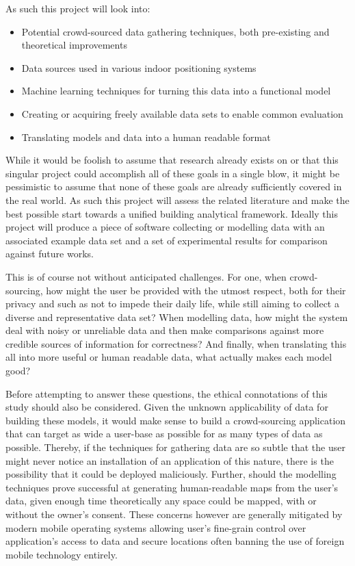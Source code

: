 \documentclass{UoYCSproject}
\begin{document}
        As such this project will look into:
        \begin{itemize}
        	\item Potential crowd-sourced data gathering techniques, both pre-existing and theoretical improvements
        	\item Data sources used in various indoor positioning systems
        	\item Machine learning techniques for turning this data into a functional model
        	\item Creating or acquiring freely available data sets to enable common evaluation
        	\item Translating models and data into a human readable format
        \end{itemize}
        
        While it would be foolish to assume that research already exists on or that this singular project could accomplish all of these goals in a single blow, it might be pessimistic to assume that none of these goals are already sufficiently covered in the real world. As such this project will assess the related literature and make the best possible start towards a unified building analytical framework. Ideally this project will produce a piece of software collecting or modelling data with an associated example data set and a set of experimental results for comparison against future works.
        
        This is of course not without anticipated challenges. For one, when crowd-sourcing, how might the user be provided with the utmost respect, both for their privacy and such as not to impede their daily life, while still aiming to collect a diverse and representative data set? When modelling data, how might the system deal with noisy or unreliable data and then make comparisons against more credible sources of information for correctness? And finally, when translating this all into more useful or human readable data, what actually makes each model good?
        
        Before attempting to answer these questions, the ethical connotations of this study should also be considered. Given the unknown applicability of data for building these models, it would make sense to build a crowd-sourcing application that can target as wide a user-base as possible for as many types of data as possible. Thereby, if the techniques for gathering data are so subtle that the user might never notice an installation of an application of this nature, there is the possibility that it could be deployed maliciously. Further, should the modelling techniques prove successful at generating human-readable maps from the user's data, given enough time theoretically any space could be mapped, with or without the owner's consent. These concerns however are generally mitigated by modern mobile operating systems allowing user's fine-grain control over application's access to data and secure locations often banning the use of foreign mobile technology entirely.
        
\end{document}
